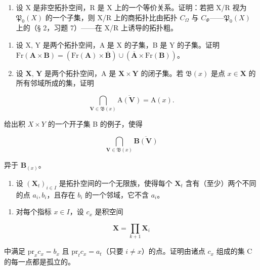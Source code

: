 \begin{enumerate}
\def\labelenumi{\arabic{enumi})}
\setcounter{enumi}{15}
\tightlist
\item
  设 X 是非空拓扑空间，R 是 X 上的一个等价关系。证明：若把 X/R 视为 \(\mathfrak{P}_{0}(X)\) 的一个子集，则 X/R 上的商拓扑比由拓扑 \(C_{\Omega}\) 与 \(C_{\Phi}\)——\(\mathfrak{P}_{0}(X)\) 上的（§ 2，习题 7）——在 X/R 上诱导的拓扑粗。
\end{enumerate}

\BourbakiExerciseGroup

\begin{enumerate}
\def\labelenumi{\arabic{enumi})}
\item
  设 X, Y 是两个拓扑空间，A 是 X 的子集，B 是 Y 的子集。证明 \(\mathrm{Fr}(\mathbf{A} \times \mathbf{B}) = (\mathrm{Fr}(\mathbf{A}) \times \overline{\mathbf{B}}) \cup (\overline{\mathbf{A}} \times \mathrm{Fr}(\mathbf{B}))\)。
\item
  设 \(\mathbf{X}\), \(\mathbf{Y}\) 是两个拓扑空间，A 是 \(\mathbf{X} \times \mathbf{Y}\) 的闭子集。若 \(\mathfrak{B}(x)\) 是点 \(x \in \mathbf{X}\) 的所有邻域所成的集，证明
\end{enumerate}

\[
\bigcap_ {\mathbf {V} \in \mathfrak {B} (x)} \overline {{\mathrm{A} (\mathbf {V})}} = \mathrm{A} (x).
\]

给出积 \(X \times Y\) 的一个开子集 B 的例子，使得

\[
\bigcap_ {\mathbf {V} \in \mathfrak {B} (x)} \overline {{\mathbf {B} (\mathbf {V})}}
\]

异于 \(\mathbf{B}_{(x)}\)。

\begin{enumerate}
\def\labelenumi{\arabic{enumi})}
\setcounter{enumi}{2}
\tightlist
\item
  设 \((\mathbf{X}_t)_{i\in I}\) 是拓扑空间的一个无限族，使得每个 \(\mathbf{X}_t\) 含有（至少）两个不同的点 \(a_i, b_i\)，且存在 \(b_i\) 的一个邻域，它不含 \(a_i\)。
\end{enumerate}

\begin{enumerate}
\def\labelenumi{\alph{enumi})}
\tightlist
\item
  对每个指标 \(x \in I\)，设 \(c_{x}\) 是积空间
\end{enumerate}

\[
\mathbf {X} = \prod_ {k + 1} \mathbf {X} _ {i}
\]

中满足 \(\mathrm{pr}_x c_x = b_x\) 且 \(\mathrm{pr}_t c_x = a_t\)（只要 \(i \neq x\)）的点。证明由诸点 \(c_x\) 组成的集 C 的每一点都是孤立的。


